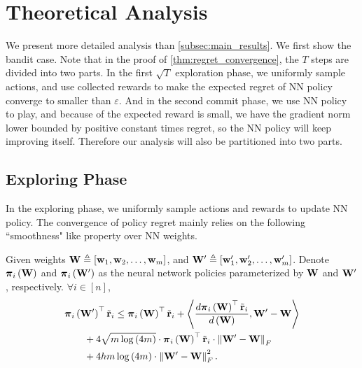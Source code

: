 \section{Theoretical Analysis}

We present more detailed analysis than \cref{subsec:main_results}. We first show the bandit case. Note that in the proof of \cref{thm:regret_convergence}, the $T$ steps are divided into two parts. In the first $\sqrt{T}$ exploration phase, we uniformly sample actions, and use collected rewards to make the expected regret of NN policy converge to smaller than $\varepsilon$. And in the second commit phase, we use NN policy to play, and because of the expected reward is small, we have the gradient norm lower bounded by positive constant times regret, so the NN policy will keep improving itself. Therefore our analysis will also be partitioned into two parts.

\subsection{Exploring Phase}
\label{subsec:exploring_phase}

In the exploring phase, we uniformly sample actions and rewards to update NN policy. The convergence of policy regret mainly relies on the following ``smoothness" like property over NN weights.

\begin{lem}
\label{lem:smoothness}
    Given weights ${\mathbf{W}} \triangleq \left[ {\mathbf{w}}_1, {\mathbf{w}}_2, \dots, {\mathbf{w}}_m \right]$, and ${\mathbf{W}}^\prime \triangleq \left[ {\mathbf{w}}_1^\prime, {\mathbf{w}}_2^\prime, \dots, {\mathbf{w}}_m^\prime \right]$. Denote ${\boldsymbol{\pi}}_i\left( {\mathbf{W}} \right)$ and ${\boldsymbol{\pi}}_i\left( {\mathbf{W}}^\prime \right)$ as the neural network policies parameterized by ${\mathbf{W}}$ and ${\mathbf{W}}^\prime$, respectively. $\forall i \in [n]$,
\begin{equation*}
\begin{split}
    &{\boldsymbol{\pi}}_i\left( {\mathbf{W}}^\prime \right)^\top {\tilde{\mathbf{r}}}_i \le {\boldsymbol{\pi}}_i\left( {\mathbf{W}} \right)^\top {\tilde{\mathbf{r}}}_i + \left\langle \frac{d {\boldsymbol{\pi}}_i\left( {\mathbf{W}} \right)^\top {\tilde{\mathbf{r}}}_i }{d\left( {\mathbf{W}} \right)}, {\mathbf{W}}^\prime - {\mathbf{W}} \right\rangle \\
    &\qquad + 4 \sqrt{m \log{\left(4m\right)}} \cdot {\boldsymbol{\pi}}_i\left( {\mathbf{W}} \right)^\top {\tilde{\mathbf{r}}}_i \cdot \left\| {\mathbf{W}}^\prime - {\mathbf{W}} \right\|_F \\
    &\qquad + 4 h m \log{\left(4m\right)} \cdot \left\| {\mathbf{W}}^\prime - {\mathbf{W}} \right\|_F^2.
\end{split}
\end{equation*}
\end{lem}

